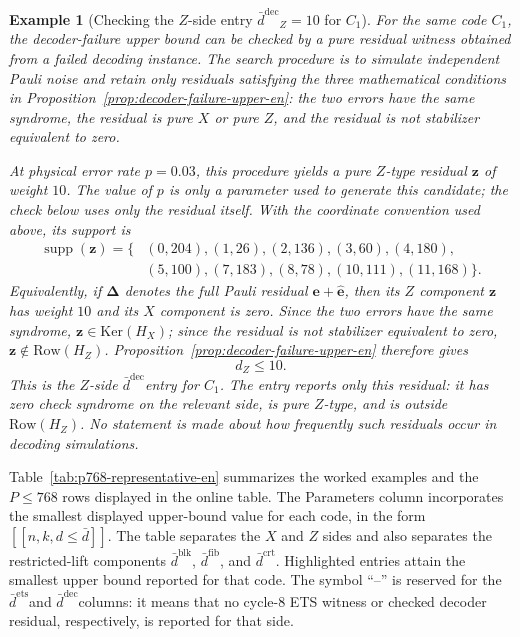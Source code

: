 \documentclass[11pt]{article}
\newcommand{\Ker}{\mathrm{Ker}}
\newcommand{\Row}{\mathrm{Row}}
\newcommand{\dbound}[1]{\ensuremath{\bar{d}^{\mathrm{#1}}}}
\newcommand{\dblk}{\dbound{blk}}
\newcommand{\dfib}{\dbound{fib}}
\newcommand{\dcrt}{\dbound{crt}}
\newcommand{\dets}{\dbound{ets}}
\newcommand{\ddec}{\dbound{dec}}
\newcommand{\markededit}[1]{#1}
\newcommand{\vect}[1]{\bm{#1}}
\newcommand{\vz}{\vect{z}}
\theoremstyle{uprightthm}
\newtheorem{example}[theorem]{Example}
\begin{document}
\begin{example}[Checking the $Z$-side entry \texorpdfstring{\(\ddec_Z=10\)}{dbar-dec-Z=10} for \(C_1\)]
For the same code $C_1$, the decoder-failure upper bound can be checked by a
pure residual witness obtained from a failed decoding instance.  The search
procedure is to simulate independent Pauli noise and retain only residuals
satisfying the three mathematical conditions in
Proposition~\ref{prop:decoder-failure-upper-en}: the two errors have the same
syndrome, the residual is pure $X$ or pure $Z$, and the residual is not
stabilizer equivalent to zero.

At physical error rate $p=0.03$, this procedure yields a pure $Z$-type
residual $\vz$ of weight $10$.  The value of \(p\) is only a parameter used to
generate this candidate; the \markededit{check} below uses only the residual itself.
With the coordinate convention used above, its support is
\[
\begin{aligned}
\operatorname{supp}(\vz)=\{&(0,204),(1,26),(2,136),(3,60),(4,180),\\
&(5,100),(7,183),(8,78),(10,111),(11,168)\}.
\end{aligned}
\]
Equivalently, if $\bm{\Delta}$ denotes the full Pauli residual
$\mathbf e+\hat{\mathbf e}$, then its $Z$ component $\vz$ has weight $10$ and
its $X$ component is zero.  Since the two errors have the same syndrome,
$\vz\in\Ker(H_X)$; since the residual is not stabilizer equivalent to zero,
$\vz\notin\Row(H_Z)$.
Proposition~\ref{prop:decoder-failure-upper-en} therefore gives
\[
d_Z\le 10.
\]
This is the $Z$-side \ddec entry for $C_1$.  The entry \markededit{reports} only this
residual: it has zero check syndrome on the relevant side, is pure $Z$-type,
and is outside $\Row(H_Z)$.  No statement is made about how frequently such
residuals occur in decoding simulations.
\end{example}

Table~\ref{tab:p768-representative-en} summarizes the worked examples and the
$P\le 768$ rows displayed in the online table.  The Parameters column
incorporates the smallest displayed upper-bound value for each code, in the
form $[[n,k,d\leq \bar d]]$.  The table separates the $X$ and $Z$ sides and
also separates the restricted-lift components \dblk, \dfib, and \dcrt.
Highlighted entries attain the smallest upper bound reported for that code.
The symbol ``--'' is reserved for the \dets and \ddec columns: it means that no
cycle-8 ETS witness or \markededit{checked decoder residual}, respectively, is
reported for that side.
\end{document}
